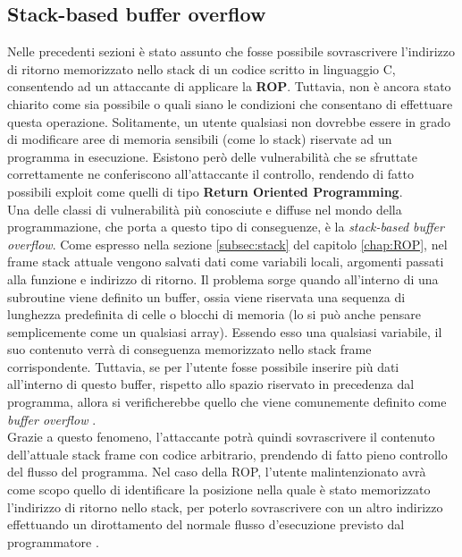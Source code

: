 \subsection{Stack-based buffer overflow}
\label{subsec:Stack-buffer overflow}
Nelle precedenti sezioni è stato assunto che fosse possibile sovrascrivere l'indirizzo di ritorno memorizzato nello stack di un codice scritto in linguaggio C, consentendo ad un attaccante di applicare la \textbf{ROP}. 
Tuttavia, non è ancora stato chiarito come sia possibile o quali siano le condizioni che consentano di effettuare questa operazione. Solitamente, un utente qualsiasi non dovrebbe essere in grado di modificare aree 
di memoria sensibili (come lo stack) riservate ad un programma in esecuzione. Esistono però delle vulnerabilità che se sfruttate correttamente ne conferiscono all'attaccante il controllo, rendendo di fatto possibili exploit 
come quelli di tipo \textbf{Return Oriented Programming}.\\
Una delle classi di vulnerabilità più conosciute e diffuse nel mondo della programmazione, che porta a questo tipo di conseguenze, è la \textit{stack-based buffer overflow}. Come espresso nella sezione \ref{subsec:stack} del capitolo \ref*{chap:ROP}, nel frame stack
attuale vengono salvati dati come variabili locali, argomenti passati alla funzione e indirizzo di ritorno. Il problema sorge quando all'interno di una subroutine viene definito un buffer, ossia viene riservata una sequenza di lunghezza predefinita di celle o blocchi di
memoria (lo si può anche pensare semplicemente come un qualsiasi array). Essendo esso una qualsiasi variabile, il suo contenuto verrà di conseguenza memorizzato nello stack frame corrispondente. Tuttavia, se per l'utente fosse possibile inserire più dati all'interno di questo buffer,
rispetto allo spazio riservato in precedenza dal programma, allora si verificherebbe quello che viene comunemente definito come \textit{buffer overflow} \cite*{Stack-bufferoverflow}.\\
Grazie a questo fenomeno, l'attaccante potrà quindi sovrascrivere il contenuto dell'attuale stack frame con codice arbitrario, prendendo di fatto pieno controllo del flusso del programma. Nel caso della ROP, l'utente malintenzionato avrà come scopo quello di identificare la 
posizione nella quale è stato memorizzato l'indirizzo di ritorno nello stack, per poterlo sovrascrivere con un altro indirizzo effettuando un dirottamento del normale flusso d'esecuzione previsto dal programmatore \cite*{ROP-bufferoverflow}.

